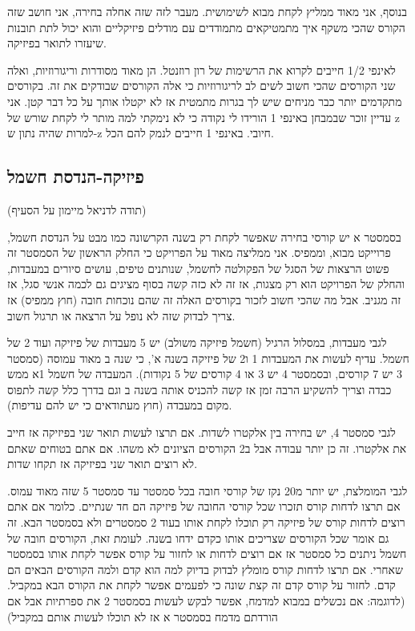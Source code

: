 \documentclass[a4paper,12pt]{article}
\begin{document}
בנוסף, אני מאוד ממליץ לקחת מבוא לשימושית. מעבר לזה שזה אחלה בחירה, אני חושב שזה הקורס שהכי משקף איך מתמטיקאים מתמודדים עם מודלים פיזיקליים והוא יכול לתת תובנות שיעזרו לתואר בפיזיקה.

לאינפי 1/2 חייבים לקרוא את הרשימות של רון רוזנטל. הן מאוד מסודרות וריגורוזיות, ואלה שני הקורסים שהכי חשוב לשים לב לריגורוזיות כי אלה הקורסים שבודקים את זה. בקורסים מתקדמים יותר כבר מניחים שיש לך בגרות מתמטית אז לא יקטלו אותך על כל דבר קטן. אני עדיין זוכר שבמבחן באינפי 1 הורידו לי נקודה כי לא נימקתי למה מותר לי לקחת שורש של z למרות שהיה נתון ש-z חיובי. באינפי 1 חייבים לנמק להם הכל.

\subsection{פיזיקה-הנדסת חשמל}

(תודה לדניאל מיימון על הסעיף)

בסמסטר א יש קורסי בחירה שאפשר לקחת רק בשנה הקרשונה כמו מבט על הנדסת חשמל, פרוייקט מבוא, וממפיס. אני ממליצה מאוד על הפרויקט כי החלק הראשון של הסמסטר זה פשוט הרצאות של הסגל של הפקולטה לחשמל, שנותנים טיפים, עושים סיורים במעבדות, והחלק של הפרויקט הוא רק מצגות, אז זה לא כזה קשה בסוף מציגים גם לכמה אנשי סגל, אז זה מגניב. אבל מה שהכי חשוב לזכור בקורסים האלה זה שהם נוכחות חובה (חוץ ממפיס) אז צריך לבדוק שזה לא נופל על הרצאה או תרגול חשוב.

לגבי מעבדות, במסלול הרגיל (חשמל פיזיקה משולב) יש 5 מעבדות של פיזיקה ועוד 2 של חשמל. עדיף לעשות את המעבדות 1 ו2 של פיזיקה בשנה א', כי שנה ב מאוד עמוסה (סמסטר 3 יש 7 קורסים, ובסמסטר 4 יש 3 או 4 קורסים של 5 נקודות). המעבדה של חשמל 1א ממש כבדה וצריך להשקיע הרבה זמן אז קשה להכניס אותה בשנה ב וגם בדרך כלל קשה לתפוס מקום במעבדה (חוץ מעתודאים כי יש להם עדיפות).

לגבי סמסטר 4, יש בחירה בין אלקטרו לשדות. אם תרצו לעשות תואר שני בפיזיקה אז חייב את אלקטרו. זה כן יותר עבודה אבל ב2 הקורסים הציונים לא משהו. אם אתם בטוחים שאתם לא רוצים תואר שני בפיזיקה אז תקחו שדות.

לגבי המומלצת, יש יותר מ20 נקז של קורסי חובה בכל סמסטר עד סמסטר 5 שזה מאוד עמוס. אם תרצו לדחות קורס תזכרו שכל קורסי החובה של פיזיקה הם חד שנתיים. כלומר אם אתם רוצים לדחות קורס של פיזיקה רק תוכלו לקחת אותו בעוד 2 סמסטרים ולא בסמסטר הבא. זה גם אומר שכל הקורסים שצריכים אותו כקדם ידחו בשנה. לעומת זאת, הקורסים חובה של חשמל ניתנים כל סמסטר אז אם רוצים לדחות או לחזור על קורס אפשר לקחת אותו בסמסטר שאחרי. אם תרצו לדחות קורס מומלץ לבדוק בדיוק למה הוא קדם ולמה הקורסים הבאים הם קדם. לחזור על קורס קדם זה קצת שונה כי לפעמים אפשר לקחת את הקורס הבא במקביל. (לדוגמה: אם נכשלים במבוא למדמח, אפשר לבקש לעשות בסמסטר 2 את ספרתיות אבל אם הורדתם מדמח בסמסטר א אז לא תוכלו לעשות אותם במקביל)
\end{document}
